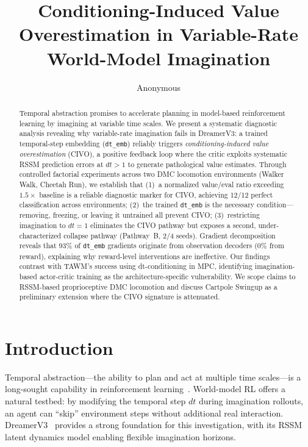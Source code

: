 \documentclass[letterpaper]{article}
\title{Conditioning-Induced Value Overestimation in Variable-Rate\\World-Model Imagination}
\author{Anonymous}
\date{}
\begin{document}
\maketitle

\begin{abstract}
Temporal abstraction promises to accelerate planning in model-based reinforcement learning by imagining at variable time scales.
We present a systematic diagnostic analysis revealing why variable-rate imagination fails in DreamerV3: a trained temporal-step embedding (\texttt{dt\_emb}) reliably triggers \emph{conditioning-induced value overestimation} (CIVO), a positive feedback loop where the critic exploits systematic RSSM prediction errors at $dt>1$ to generate pathological value estimates.
Through controlled factorial experiments across two DMC locomotion environments (Walker Walk, Cheetah Run), we establish that (1)~a normalized value/eval ratio exceeding $1.5\times$ baseline is a reliable diagnostic marker for CIVO, achieving 12/12 perfect classification across environments; (2)~the trained \texttt{dt\_emb} is the necessary condition---removing, freezing, or leaving it untrained all prevent CIVO; (3)~restricting imagination to $dt{=}1$ eliminates the CIVO pathway but exposes a second, under-characterized collapse pathway (Pathway~B, 2/4 seeds).
Gradient decomposition reveals that 93\% of \texttt{dt\_emb} gradients originate from observation decoders (0\% from reward), explaining why reward-level interventions are ineffective.
Our findings contrast with TAWM's success using dt-conditioning in MPC, identifying imagination-based actor-critic training as the architecture-specific vulnerability.
We scope claims to RSSM-based proprioceptive DMC locomotion and discuss Cartpole Swingup as a preliminary extension where the CIVO signature is attenuated.
\end{abstract}

\section{Introduction}

Temporal abstraction---the ability to plan and act at multiple time scales---is a long-sought capability in reinforcement learning~\cite{sutton1999options,vezhnevets2017feudal}.
World-model RL offers a natural testbed: by modifying the temporal step $dt$ during imagination rollouts, an agent can ``skip'' environment steps without additional real interaction.
DreamerV3~\cite{hafner2023dreamerv3} provides a strong foundation for this investigation, with its RSSM latent dynamics model enabling flexible imagination horizons.
\end{document}
